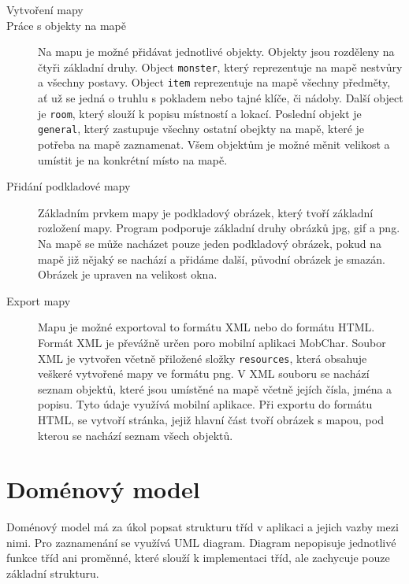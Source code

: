 \documentclass[thesis=B,czech]{resources/FITthesis}[2012/06/26]
\begin{document}
	\begin{description}
		\item[Vytvoření mapy]
		\item[Práce s objekty na mapě]
Na mapu je možné přidávat jednotlivé objekty. Objekty jsou rozděleny na čtyři základní druhy. Object \texttt{monster}, který reprezentuje na mapě nestvůry a všechny postavy. Object \texttt{item} reprezentuje na mapě všechny předměty, ať už se jedná o truhlu s pokladem nebo tajné klíče, či nádoby. Další object je \texttt{room}, který slouží k popisu místností a lokací. Poslední objekt je \texttt{general}, který zastupuje všechny ostatní obejkty na mapě, které je potřeba na mapě zaznamenat. Všem objektům je možné měnit velikost a umístit je na konkrétní místo na mapě.

		\item[Přidání podkladové mapy]
Základním prvkem mapy je podkladový obrázek, který tvoří základní rozložení mapy. Program podporuje základní druhy obrázků jpg, gif a png. Na mapě se může nacházet pouze jeden podkladový obrázek, pokud na mapě již nějaký se nachází a přidáme další, původní obrázek je smazán. Obrázek je upraven na velikost okna. 
		
		\item[Export mapy]
Mapu je možné exportoval to formátu XML nebo do formátu HTML. Formát XML je převážně určen poro mobilní aplikaci MobChar. Soubor XML je vytvořen včetně přiložené složky \texttt{resources}, která obsahuje veškeré vytvořené mapy ve formátu png. V XML souboru se nachází seznam objektů, které jsou umístěné na mapě včetně jejích čísla, jména a popisu. Tyto údaje využívá mobilní aplikace. Při exportu do formátu HTML, se vytvoří stránka, jejiž hlavní část tvoří obrázek s mapou, pod kterou se nachází seznam všech objektů.

	\end{description}
	\section{Doménový model}
Doménový model má za úkol popsat strukturu tříd v aplikaci a jejich vazby mezi nimi. Pro zaznamenání se využívá UML diagram. Diagram nepopisuje jednotlivé funkce tříd ani proměnné, které slouží k implementaci tříd, ale zachycuje pouze základní strukturu.
\end{document}
